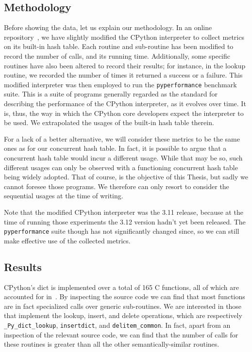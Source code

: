 \subsection{Methodology}\label{subsec:dict-metrics-methodology}

Before showing the data, let us explain our methodology.
In an online repository~\cite{dict-metrics}, we have slightly modified the CPython interpreter to collect metrics on its built-in hash table.
Each routine and sub-routine has been modified to record the number of calls, and its running time.
Additionally, some specific routines have also been altered to record their results; for instance, in the lookup routine, we recorded the number of times it returned a success or a failure.
This modified interpreter was then employed to run the \texttt{pyperformance} benchmark suite.
This is a suite of programs generally regarded as the standard for describing the performance of the CPython interpreter, as it evolves over time.
It is, thus, the way in which the CPython core developers expect the interpreter to be used.
We extrapolated the usages of the built-in hash table therein.

For a lack of a better alternative, we will consider these metrics to be the same ones as for our concurrent hash table.
In fact, it is possible to argue that a concurrent hash table would incur a different usage.
While that may be so, such different usages can only be observed with a functioning concurrent hash table being widely adopted.
That of course, is the objective of this Thesis, but sadly we cannot foresee those programs.
We therefore can only resort to consider the sequential usages at the time of writing.

Note that the modified CPython interpreter was the 3.11 release, because at the time of running those experiments the 3.12 version hadn't yet been released.
The \texttt{pyperformance} suite though has not significantly changed since, so we can still make effective use of the collected metrics.

\subsection{Results}\label{subsec:dict-metrics-results}

CPython's dict is implemented over a total of 165 C functions, all of which are accounted for in~\cite{dict-metrics}.
By inspecting the source code we can find that most functions are in fact specialized calls over generic sub-routines.
We are interested in those that implement the lookup, insert, and delete operations, which are respectively \texttt{\_Py\_dict\_lookup}, \texttt{insertdict}, and \texttt{delitem\_common}.
In fact, apart from an inspection of the relevant source code, we can find that the number of calls for these routines is greater than all the other semantically-similar routines.

